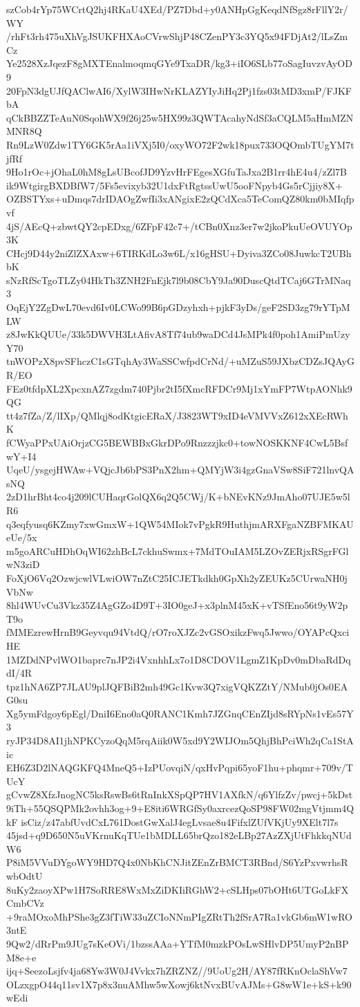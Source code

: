 szCob4rYp75WCrtQ2hj4RKaU4XEd/PZ7Dbd+y0ANHpGgKeqdNfSgz8rFllY2r/WY
/rhFt3rh475uXhVgJSUKFHXAoCVrwShjP48CZenPY3c3YQ5x94FDjAt2/lLsZmCz
Ye2528XzJqezF8gMXTEnalmoqmqGYe9TxaDR/kg3+iIO6SLb77oSagIuvzvAyOD9
20FpN3dgUJfQAClwAI6/XylW3IHwNrKLAZYIyJiHq2Pj1fzs03tMD3xmP/FJKFbA
qCkBBZZTeAuN0SqohWX9f26j25w5HX99z3QWTAcahyNdSf3aCQLM5aHmMZNMNR8Q
Rn9LzW0Zdw1TY6GK5rAa1iVXj5I0/oxyWO72F2wk18pux733OQOmbTUgYM7tjfRf
9Ho1rOc+jOhaL0hM8gLsUBcofJD9YzvHrFEgesXGfuTaJxa2B1rr4hE4u4/zZl7B
ik9WtgirgBXDBfW7/5Fs5evixyb32U1dxFtRgtssUwU5ooFNpyb4Gs5rCjjiy8X+
OZBSTYxs+uDmqs7drIDAOgZwfIi3xANgixE2zQCdXca5TeComQZ80km0bMIqfpvf
4jS/AEcQ+zbwtQY2cpEDxg/6ZFpF42c7+/tCBn0Xnz3er7w2jkoPkuUeOVUYOp3K
CHcj9D44y2niZlZXAxw+6TIRKdLo3w6L/x16gHSU+Dyiva3ZCo08JuwkcT2UBhbK
sNzRfScTgoTLZy04HkTh3ZNH2FnEjk7l9b08CbY9Ja90DuscQtdTCaj6GTrMNaq3
OqEjY2ZgDwL70evd6Iv0LCWo99B6pGDzyhxh+pjkF3yDs/geF2SD3zg79rYTpMLW
z8JwKkQUUe/33k5DWVH3LtAfivA8Tf74ub9waDCd4JsMPk4f0poh1AmiPmUzyY70
tnWOPzX8pvSFhczC1sGTqhAy3WaSSCwfpdCrNd/+uMZuS59JXbzCDZsJQAyGR/EO
FEz0tfdpXL2XpcxnAZ7zgdm740Pjbr2tI5fXmcRFDCr9Mj1xYmFP7WtpAONhk9QG
tt4z7fZa/Z/lIXp/QMlqj8odKtgicERaX/J3823WT9xID4eVMVVxZ612xXEcRWhK
fCWyaPPxUAiOrjzCG5BEWBBxGkrDPo9Rnzzzjkc0+towNOSKKNF4CwL5BsfwY+I4
UqeU/ysgejHWAw+VQjcJb6bPS3PnX2hm+QMYjW3i4gzGnaVSw8SiF721lnvQAsNQ
2zD1hrBht4co4j209lCUHaqrGolQX6q2Q5CWj/K+bNEvKNz9JmAho07UJE5w5lR6
q3eqfyusq6KZmy7xwGmxW+1QW54MIok7vPgkR9HuthjmARXFgaNZBFMKAUeUe/5x
m5goARCuHDhOqWI62zhBcL7ckhuSwmx+7MdTOuIAM5LZOvZERjxRSgrFGlwN3ziD
FoXjO6Vq2OzwjcwlVLwiOW7nZtC25ICJETkdkh0GpXh2yZEUKz5CUrwaNH0jVbNw
8hl4WUvCu3Vkz35Z4AgGZo4D9T+3IO0geJ+x3plnM45xK+vTSfEno56t9yW2pT9o
fMMEzrewHrnB9Geyvqu94VtdQ/rO7roXJZc2vGSOxikzFwq5Jwwo/OYAPcQxciHE
1MZDdNPvlWO1baprc7nJP2i4VxnhhLx7o1D8CDOV1LgmZ1KpDv0mDbaRdDqdI/4R
tpz1hNA6ZP7JLAU9plJQFBiB2mh49Gc1Kvw3Q7xigVQKZZtY/NMub0jOs0EAG0su
Xg5ymFdgoy6pEgl/DniI6Eno0aQ0RANC1Kmh7JZGnqCEnZIjd8sRYpNs1vEs57Y3
ryJP34D8AI1jhNPKCyzoQqM5rqAiik0W5xd9Y2WIJOm5QhjBhPciWh2qCa1StAic
EH6Z3D2lNAQGKFQ4MneQ5+IzPUovqiN/qxHvPqpi65yoF1hu+phqmr+709v/TUcY
gCvwZ8XfzJnogNC5ksRswBs6tRnInkXSpQP7HV1AXfkN/q6YlfzZv/pwcj+5kDst
9iTh+55QSQPMk2ovhh3og+9+E8iti6WRGfSy0axrcezQoSP98FW02mgVtjmm4QkF
isCiz/z47abfUvdCxL761DostGwXalJ4egLvsae8u4FifxlZUfVKjUy9XElt7l7s
45jsd+q9D650N5uVKrnuKqTUe1bMDLL65brQzo182eLBp27AzZXjUtFhkkqNUdW6
P8iM5VVuDYgoWY9HD7Q4x0NbKhCNJitZEnZrBMCT3RBnd/S6YzPxvwrhsRwbOdtU
8uKy2zaoyXPw1H7SoRRE8WxMxZiDKIiRGhW2+cSLHps07bOHt6UTGoLkFXCmbCVz
+9raMOxoMhPShe3gZ3fTiW33uZCIoNNmPIgZRtTh2fSrA7Ra1vkGb6mW1wRO3ntE
9Qw2/dRrPm9JUg7sKeOVi/1bzssAAa+YTfM0mzkPOsLwSHlvDP5UmyP2nBPM8e+e
ijq+SeezoLsjfv4ja68Yw3W0J4Vvkx7hZRZNZ//9UoUg2H/AY87fRKnOclaShVw7
OLzxgpO44q11sv1X7p8x3nuAMhw5wXowj6ktNvxBUvAJMs+G8wW1e+kS+k90wEdi
